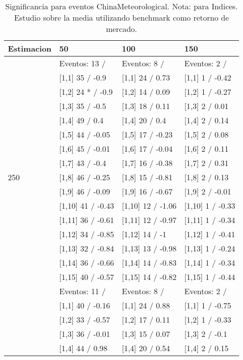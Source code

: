 \begin{table}

\caption{Significancia para eventos ChinaMeteorological. Nota: para Indices. Estudio sobre la media utilizando benchmark como retorno de mercado.}
\centering
\begin{tabular}[t]{llll}
\toprule
Estimacion & 50 & 100 & 150\\
\midrule
 & Eventos:  13 / & Eventos:  8 / & Eventos:  2 /\\
 & {}[1,1] 35  / -0.9 & {}[1,1] 24  / 0.73 & {}[1,1] 1  / -0.42\\
 & {}[1,2] 24 * / -0.9 & {}[1,2] 14  / 0.09 & {}[1,2] 1  / -0.27\\
 & {}[1,3] 35  / -0.5 & {}[1,3] 18  / 0.11 & {}[1,3] 2  / 0.01\\
 & {}[1,4] 49  / 0.4 & {}[1,4] 20  / 0.4 & {}[1,4] 2  / 0.14\\
\addlinespace
 & {}[1,5] 44  / -0.05 & {}[1,5] 17  / -0.23 & {}[1,5] 2  / 0.08\\
 & {}[1,6] 45  / -0.01 & {}[1,6] 17  / -0.04 & {}[1,6] 2  / 0.11\\
 & {}[1,7] 43  / -0.4 & {}[1,7] 16  / -0.38 & {}[1,7] 2  / 0.31\\
250 & {}[1,8] 46  / -0.25 & {}[1,8] 15  / -0.81 & {}[1,8] 2  / 0.13\\
 & {}[1,9] 46  / -0.09 & {}[1,9] 16  / -0.67 & {}[1,9] 2  / -0.01\\
\addlinespace
 & {}[1,10] 41  / -0.43 & {}[1,10] 12  / -1.06 & {}[1,10] 1  / -0.33\\
 & {}[1,11] 36  / -0.61 & {}[1,11] 12  / -0.97 & {}[1,11] 1  / -0.34\\
 & {}[1,12] 34  / -0.85 & {}[1,12] 14  / -1 & {}[1,12] 1  / -0.41\\
 & {}[1,13] 32  / -0.84 & {}[1,13] 13  / -0.98 & {}[1,13] 1  / -0.24\\
 & {}[1,14] 36  / -0.66 & {}[1,14] 14  / -0.83 & {}[1,14] 1  / -0.34\\
\addlinespace
 & {}[1,15] 40  / -0.57 & {}[1,15] 14  / -0.82 & {}[1,15] 1  / -0.44\\
 & Eventos:  11 / & Eventos:  8 / & Eventos:  2 /\\
 & {}[1,1] 40  / -0.16 & {}[1,1] 24  / 0.88 & {}[1,1] 1  / -0.75\\
 & {}[1,2] 33  / -0.57 & {}[1,2] 17  / 0.11 & {}[1,2] 1  / -0.33\\
 & {}[1,3] 36  / -0.01 & {}[1,3] 15  / 0.07 & {}[1,3] 2  / -0.1\\
\addlinespace
 & {}[1,4] 44  / 0.98 & {}[1,4] 20  / 0.54 & {}[1,4] 2  / 0.15\\

\end{tabular}
\end{table}
